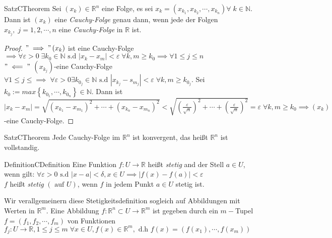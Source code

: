 \documentclass[11.5 pt, a4paper]{memoir}
\begin{document}
\begin{ibox}[12]{Satz}{CTheorem}
    Sei $ \left( x_k \right) \in \mathbb{R}^n $ eine Folge, es sei $ x_k = \left( x_{k_{1}}, x_{k_{2}},\cdots, x_{k_{n}} \right) \forall \;
	k \in \mathbb{N}$. Dann ist $ \left( x_k \right)  $ eine \textit{Cauchy-Folge} genau dann, wenn jede der Folgen $ x_{k_{j}}, \; j = 1,2
	, \cdots ,n$ eine \textit{Cauchy-Folge} in $ \mathbb{R} $ ist.
\end{ibox}
\begin{proof}
	$ " \implies" \left( x_k \right)  $ ist eine Cauchy-Folge $ \implies \forall \varepsilon > 0 \; \exists k_0 \in \mathbb{N} \text{ s.d } 
	\left| x_k - x_m \right| < \varepsilon \; \forall k,m \geq k_0  \implies \forall  1 \leq j \leq n $  \\
	$ " \impliedby" $ $ \left( x_{k_{j}} \right)  $-eine Cauchy-Folge	$ \forall 1  \leq j \leq \implies \; \forall \varepsilon > 0
	\exists k_{0_{j}} \in \mathbb{N} \text{ s.d } \left| x_{k_{j}} - s_{m_{j}} \right| < \varepsilon \; \forall k,m \geq k_{0_{j}}$.
	Sei $ k_0 := max \left\{ k_{0_{1}}, \cdots, k_{0_{n}} \right\} \in \mathbb{N} $. Dann ist $ \left| x_k - x_m \right| = \sqrt{
	\left( x_{k_1} - x_{m_1} \right)^{2} + \cdots + \left( x_{k_n} - x_{m_n} \right)^{2}} <  
	\sqrt{\left( \frac{ \varepsilon}{\sqrt{n}} \right)^2 + \cdots +  \left( \frac{ \varepsilon}{\sqrt{n}} \right)^2} = \varepsilon \;
	\forall k, m \geq k_0 \implies \left( x_k \right)$-eine Cauchy-Folge.
\end{proof}

\begin{ibox}[13]{Satz}{CTheorem}
    Jede Cauchy-Folge im $ \mathbb{R}^n  $ ist konvergent, das heißt $ \mathbb{R}^n  $ ist vollstandig.
\end{ibox}


\begin{ibox}[]{Definition}{CDefinition}
    Eine Funktion $ f: U \to \mathbb{R}  $ heißt \textit{stetig} and der Stell $ a \in  U $, wenn gilt: $ \forall  \varepsilon >0 
	\text{ s.d } \left| x-a \right| < \delta, x \in  U \implies \left| f(x)-f(a) \right| < \varepsilon $\\
	$ f $ heißt \textit{stetig} $ \left( \text{ auf } U \right)  $, wenn $ f $ in jedem Punkt $ a \in  U $ stetig ist.
\end{ibox}
Wir verallgemeinern diese Stetigkeitsdefinition sogleich auf Abbildungen mit Werten in $ \mathbb{R}^m $. Eine Abbildung $ f : \mathbb{R}^n 
\subset U \to \mathbb{R}^m  $ ist gegeben durch ein $ m- $Tupel $ f = (f_1,f_2,\cdots, f_m) $ von Funktionen $ f_{j}: U \to \mathbb{R} 
, 1 \leq  j \leq m \; \forall  x \in  U, f(x) \in  \mathbb{R}^m, \text{ d.h } f(x) = \left( f(x_1), \cdots, f(x_m) \right) $ 
\end{document}
